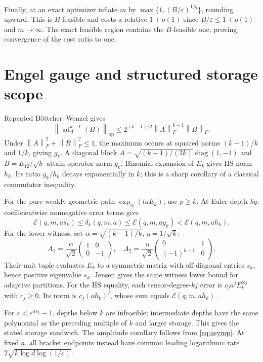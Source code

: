 \documentclass[11pt,a4paper]{article}
\newcommand{\op}{\mathrm{op}}
\newcommand{\E}{\mathcal E}
\newcommand{\norm}[1]{\left\lVert#1\right\rVert}
\DeclareMathOperator{\ad}{ad}
\begin{document}
Finally, at an exact optimizer inflate \(m\) by
\(\max\{1,(B/\varepsilon)^{1/q}\}\), rounding upward.
This is \(B\)-feasible and costs a relative \(1+o(1)\) since
\(B/\varepsilon\le1+o(1)\) and \(m\to\infty\).
The exact feasible region contains the \(B\)-feasible one, proving
convergence of the cost ratio to one.

\section{Engel gauge and structured storage scope}\label{app:engel}
Repeated B\"ottcher--Wenzel gives
\[
 \norm{\ad_A^{k-1}(B)}_{\op}
 \le2^{(k-1)/2}\norm A_F^{k-1}\norm B_F.
\]
Under \(\norm A_F^2+\norm B_F^2\le1\), the maximum occurs at squared
norms \((k-1)/k\) and \(1/k\), giving \(g_k\).
A diagonal block \(A=\sqrt{(k-1)/(2k)}\operatorname{diag}(1,-1)\)
and \(B=E_{12}/\sqrt k\) attain operator norm \(g_k\).
Binomial expansion of \(E_k\) gives HS norm \(h_k\).
Its ratio \(g_k/h_k\) decays exponentially in \(k\); this is a sharp
corollary of a classical commutator inequality.

For the pure weakly geometric path \(\exp_\otimes(taE_k)\), use \(p\ge k\).
At Euler depth \(kq\), coefficientwise nonnegative error terms give
\[
 \E(q,m,a s_k)\le\delta_k(q,m,a)\le\E(q,m,a g_k)<\E(q,m,a h_k).
\]
For the lower witness, set \(\alpha=\sqrt{(k-1)/k}\), \(\eta=1/\sqrt k\):
\[
 A_1=\frac\alpha{\sqrt2}\begin{pmatrix}1&0\\0&-1\end{pmatrix},
 \quad A_2=\frac\eta{\sqrt2}
                 \begin{pmatrix}0&1\\(-1)^{k-1}&0\end{pmatrix}.
\]
Their unit tuple evaluates \(E_k\) to a symmetric matrix with off-diagonal
entries \(s_k\), hence positive eigenvalue \(s_k\).
Jensen gives the same witness lower bound for adaptive partitions.
For the HS equality, each tensor-degree-\(kj\) error is
\(c_j a^j E_k^{\otimes j}\) with \(c_j\ge0\).
Its norm is \(c_j(a h_k)^j\), whose sum equals \(\E(q,m,a h_k)\).

For \(\varepsilon<e^{a s_k}-1\), depths below \(k\) are infeasible;
intermediate depths have the same polynomial as the preceding multiple of
\(k\) and larger storage. This gives the stated storage sandwich.
The amplitude corollary follows from \eqref{eq:asymp}.
At fixed \(a\), all bracket endpoints instead have common leading
logarithmic rate \(2\sqrt{k\log d\log(1/\varepsilon)}\).
\end{document}
